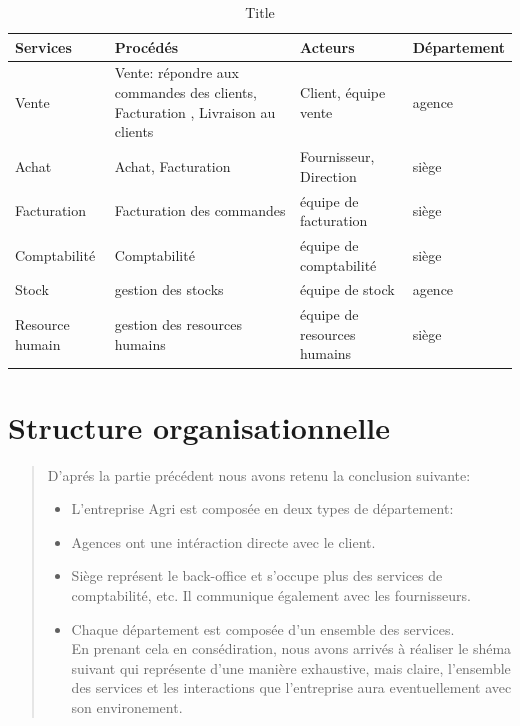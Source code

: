 \documentclass[a4paper]{report}
\begin{document}
\begin{doublespace}
\begin{table}[H]
\begin{center}
\begin{tabularx}{17.5cm}{|p{2.5cm}|p{7cm}|X|p{2cm}|}
\hline
Services & Procédés & Acteurs & Département \\
\hline
Vente & Vente: répondre aux commandes des clients, Facturation ,
Livraison au clients & Client, équipe vente & agence \\
\hline
Achat & Achat, Facturation & Fournisseur, Direction & siège \\
\hline
Facturation & Facturation des commandes & équipe de facturation &
siège \\
\hline
Comptabilité & Comptabilité & équipe de comptabilité & siège \\
\hline
Stock & gestion des stocks & équipe de stock & agence \\
\hline
Resource humain & gestion des resources humains & équipe de resources
humains & siège \\
\hline
\end{tabularx}
\caption{Title}
\end{center}
\end{table}
\section{Structure organisationnelle}

\begin{quote}
D'aprés la partie précédent nous avons retenu la conclusion suivante:

\begin{itemize}
\item
  L'entreprise Agri est composée en deux types de département:
\end{itemize}

\begin{itemize}
\item
  Agences ont une intéraction directe avec le client.
\item
  Siège représent le back-office et s'occupe plus des services de
  comptabilité, etc. Il communique également avec les fournisseurs.
\end{itemize}

\begin{itemize}
\item
  Chaque département est composée d'un ensemble des services.\\
  En prenant cela en consédiration, nous avons arrivés à réaliser le
  shéma suivant qui représente d'une manière exhaustive, mais claire,
  l'ensemble des services et les interactions que l'entreprise aura
  eventuellement avec son environement.
\end{itemize}
\end{quote}


\end{doublespace}
\end{document}
